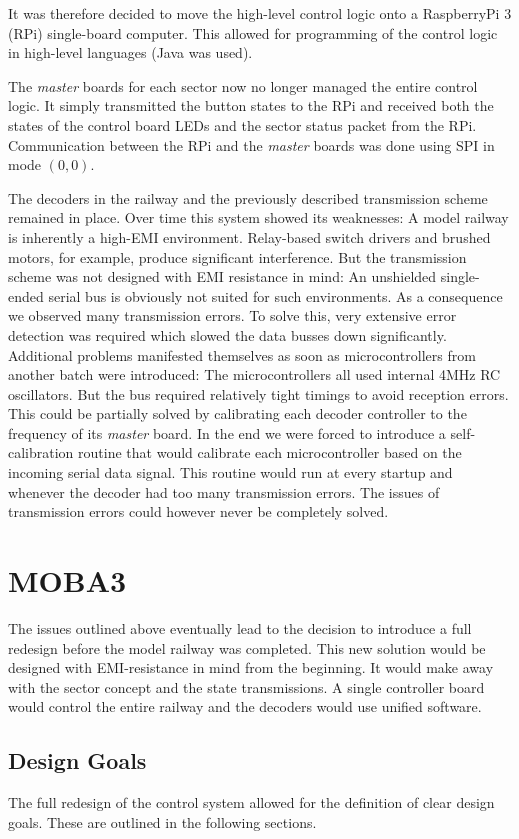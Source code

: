 \documentclass{scrreprt}
\begin{document}
It was therefore decided to move the high-level control logic onto a RaspberryPi 3 (RPi) single-board computer.
This allowed for programming of the control logic in high-level languages (Java was used).

The \emph{master} boards for each sector now no longer managed the entire control logic.
It simply transmitted the button states to the RPi and received both the states of the control board LEDs and the sector status packet from the RPi.
Communication between the RPi and the \emph{master} boards was done using SPI in mode $(0,0)$.

The decoders in the railway and the previously described transmission scheme remained in place.
Over time this system showed its weaknesses:
A model railway is inherently a high-EMI environment.
Relay-based switch drivers and brushed motors, for example, produce significant interference.
But the transmission scheme was not designed with EMI resistance in mind:
An unshielded single-ended serial bus is obviously not suited for such environments.
As a consequence we observed many transmission errors.
To solve this, very extensive error detection was required which slowed the data busses down significantly.
Additional problems manifested themselves as soon as microcontrollers from another batch were introduced:
The microcontrollers all used internal 4MHz RC oscillators.
But the bus required relatively tight timings to avoid reception errors.
This could be partially solved by calibrating each decoder controller to the frequency of its \emph{master} board.
In the end we were forced to introduce a self-calibration routine that would calibrate each microcontroller based on the incoming serial data signal.
This routine would run at every startup and whenever the decoder had too many transmission errors.
The issues of transmission errors could however never be completely solved.

\section{MOBA3}
The issues outlined above eventually lead to the decision to introduce a full redesign before the model railway was completed.
This new solution would be designed with EMI-resistance in mind from the beginning.
It would make away with the sector concept and the state transmissions.
A single controller board would control the entire railway and the decoders would use unified software.

\subsection{Design Goals}
The full redesign of the control system allowed for the definition of clear design goals. These are outlined in the following sections.
\end{document}
